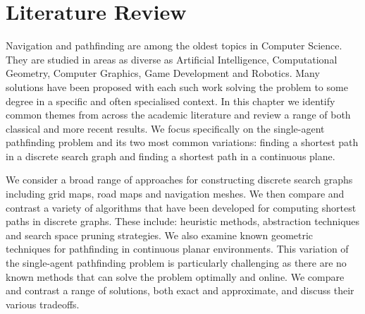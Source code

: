 \chapter{Literature Review}
\label{cha::lit::abstract}
Navigation and pathfinding are among the oldest topics in Computer Science.
They are studied in areas as diverse as Artificial Intelligence, 
Computational Geometry, Computer Graphics, Game Development and Robotics. 
Many solutions have been proposed with each such work solving the problem to 
some degree in a specific and often specialised context.
In this chapter we identify common themes from across the academic 
literature and review a range of both classical and more recent results.
We focus specifically on the single-agent pathfinding problem and its
two most common variations: finding a shortest path in a discrete search graph 
and finding a shortest path in a continuous plane.

We consider a broad range of approaches for constructing discrete search graphs
including grid maps, road maps and navigation meshes.  We then compare and
contrast a variety of algorithms that have been developed for computing shortest paths in 
discrete graphs. These include: heuristic methods, 
abstraction techniques and search space pruning strategies.  
We also examine known geometric techniques for pathfinding in continuous planar 
environments. This variation of the single-agent pathfinding problem is
particularly challenging as there are no known methods that can solve the
problem optimally and online.  We compare and contrast a range of solutions,
both exact and approximate, and discuss their various tradeoffs.


